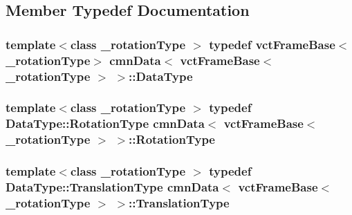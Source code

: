 \subsection{Member Typedef Documentation}
\hypertarget{classcmn_data_3_01vct_frame_base_3_01__rotation_type_01_4_01_4_a6d3becc05b41db88283c842177d23bea}{
\subsubsection[{Data\-Type}]{\setlength{\rightskip}{0pt plus 5cm}template$<$class \-\_\-rotation\-Type $>$ typedef {\bf vct\-Frame\-Base}$<$\-\_\-rotation\-Type$>$ {\bf cmn\-Data}$<$ {\bf vct\-Frame\-Base}$<$ \-\_\-rotation\-Type $>$ $>$\-::{\bf Data\-Type}}}\label{classcmn_data_3_01vct_frame_base_3_01__rotation_type_01_4_01_4_a6d3becc05b41db88283c842177d23bea}
\hypertarget{classcmn_data_3_01vct_frame_base_3_01__rotation_type_01_4_01_4_a8757351740a52df6d2b5be5e04ba0b0b}{
\subsubsection[{Rotation\-Type}]{\setlength{\rightskip}{0pt plus 5cm}template$<$class \-\_\-rotation\-Type $>$ typedef {\bf Data\-Type\-::\-Rotation\-Type} {\bf cmn\-Data}$<$ {\bf vct\-Frame\-Base}$<$ \-\_\-rotation\-Type $>$ $>$\-::{\bf Rotation\-Type}}}\label{classcmn_data_3_01vct_frame_base_3_01__rotation_type_01_4_01_4_a8757351740a52df6d2b5be5e04ba0b0b}
\hypertarget{classcmn_data_3_01vct_frame_base_3_01__rotation_type_01_4_01_4_a1fc56c85e3cdf6618625668e4c95950f}{
\subsubsection[{Translation\-Type}]{\setlength{\rightskip}{0pt plus 5cm}template$<$class \-\_\-rotation\-Type $>$ typedef {\bf Data\-Type\-::\-Translation\-Type} {\bf cmn\-Data}$<$ {\bf vct\-Frame\-Base}$<$ \-\_\-rotation\-Type $>$ $>$\-::{\bf Translation\-Type}}}\label{classcmn_data_3_01vct_frame_base_3_01__rotation_type_01_4_01_4_a1fc56c85e3cdf6618625668e4c95950f}


